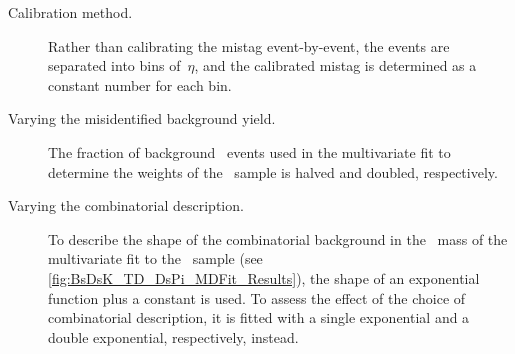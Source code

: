 %
\begin{description}
    \item[Calibration method.]
        Rather than calibrating the mistag event-by-event, the events are separated into bins of~\(\eta\), and the calibrated mistag is determined as a constant number for each bin.
    \item[Varying the misidentified background yield.]
        The fraction of background \BsDsK~events used in the multivariate fit to determine the weights of the \BsDsPi~sample is halved and doubled, respectively.
    \item[Varying the combinatorial description.]
        To describe the shape of the combinatorial background in the \DsmPip~mass of the multivariate fit to the \BsDsPi~sample (see \cref{fig:BsDsK_TD_DsPi_MDFit_Results}), the shape of an exponential function plus a constant is used.
        To assess the effect of the choice of combinatorial description, it is fitted with a single exponential and a double exponential, respectively, instead.
\end{description}

